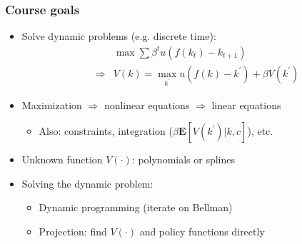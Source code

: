\documentclass[bigger]{beamer}
\begin{document}
\begin{frame}%

\frametitle{Course goals}

\begin{itemize}
\item Solve dynamic problems (e.g. discrete time):%
\begin{eqnarray*}
&&\max \sum \beta ^{t}u\left( f\left( k_{t}\right) -k_{t+1}\right) \\
&\Rightarrow &V\left( k\right) =\max_{k^{\prime }}u\left( f\left( k\right)
-k^{\prime }\right) +\beta V\left( k^{\prime }\right)
\end{eqnarray*}

\item Maximization $\Rightarrow $ nonlinear equations $\Rightarrow $ linear
equations

\begin{itemize}
\item Also: constraints, integration ($\beta \mathbf{E}\left[ V\left(
k^{\prime }\right) |k,c\right] $), etc.
\end{itemize}

\item Unknown function $V\left( \cdot \right) $: polynomials or splines

\item Solving the dynamic problem:

\begin{itemize}
\item Dynamic programming (iterate on Bellman)

\item Projection: find $V\left( \cdot \right) $ and policy functions directly
\end{itemize}
\end{itemize}

\end{frame}
\end{document}
